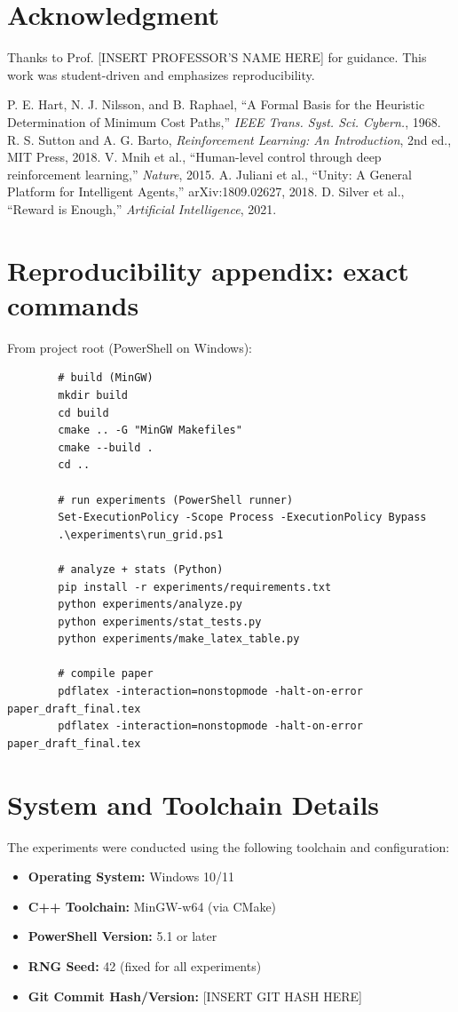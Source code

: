 \documentclass[conference]{IEEEtran}
\begin{document}
	\section*{Acknowledgment}
	Thanks to Prof. [INSERT PROFESSOR'S NAME HERE] for guidance. This work was student-driven and emphasizes reproducibility.
	
	
	\begin{thebibliography}{9}
		 P. E. Hart, N. J. Nilsson, and B. Raphael, ``A Formal Basis for the Heuristic Determination of Minimum Cost Paths,'' \emph{IEEE Trans. Syst. Sci. Cybern.}, 1968.
		 R. S. Sutton and A. G. Barto, \emph{Reinforcement Learning: An Introduction}, 2nd ed., MIT Press, 2018.
		 V. Mnih et al., ``Human-level control through deep reinforcement learning,'' \emph{Nature}, 2015.
		 A. Juliani et al., ``Unity: A General Platform for Intelligent Agents,'' arXiv:1809.02627, 2018.
		 D. Silver et al., ``Reward is Enough,'' \emph{Artificial Intelligence}, 2021.
	\end{thebibliography}
	
	\appendix
	\section{Reproducibility appendix: exact commands}
	From project root (PowerShell on Windows):
	\begin{verbatim}
		# build (MinGW)
		mkdir build
		cd build
		cmake .. -G "MinGW Makefiles"
		cmake --build .
		cd ..
		
		# run experiments (PowerShell runner)
		Set-ExecutionPolicy -Scope Process -ExecutionPolicy Bypass
		.\experiments\run_grid.ps1
		
		# analyze + stats (Python)
		pip install -r experiments/requirements.txt
		python experiments/analyze.py
		python experiments/stat_tests.py
		python experiments/make_latex_table.py
		
		# compile paper
		pdflatex -interaction=nonstopmode -halt-on-error paper_draft_final.tex
		pdflatex -interaction=nonstopmode -halt-on-error paper_draft_final.tex
	\end{verbatim}
	
	\section{System and Toolchain Details}
	The experiments were conducted using the following toolchain and configuration:
	\begin{itemize}
		\item \textbf{Operating System:} Windows 10/11
		\item \textbf{C++ Toolchain:} MinGW-w64 (via CMake)
		\item \textbf{PowerShell Version:} 5.1 or later
		\item \textbf{RNG Seed:} 42 (fixed for all experiments)
		\item \textbf{Git Commit Hash/Version:} [INSERT GIT HASH HERE]
	\end{itemize}
	
\end{document}
